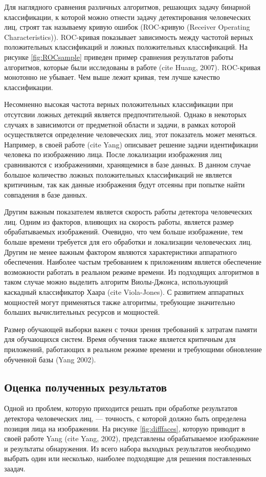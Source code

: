 Для наглядного сравнения различных алгоритмов, решающих задачу бинарной классификации, к которой можно отнести задачу детектирования человеческих лиц, строят так называему кривую ошибок (ROC-кривую (Receiver Operating Characteristics)). ROC-кривая показывает зависимость между частотой верных положительных классификаций и ложных положительных классификаций. На рисунке \ref{fig:ROCsample} приведен пример сравнения результатов работы алгоритмов, которые были исследованы в работе (cite Huang, 2007). ROC-кривая монотонно не убывает. Чем выше лежит кривая, тем лучше качество классификации.

Несомненно высокая частота верных положительных классификации при отсутсвии ложных детекций является предпочтительной. Однако в некоторых случаях в зависимотси от предметной области и задачи, в рамках которой осуществляется определение человеческих лиц, этот показатель может меняться. Например, в своей работе (cite Yang) описывает решение задачи идентификации человека по изображению лица. После локализации изображения лиц сравниваются с изображениями, хранящемися в базе данных. В данном случае большое количество ложных положительных классификаций не является критичиным, так как данные изображения будут отсеяны при попытке найти совпадения в базе данных.

Другим важным показателем является скорость работы детектора человеческих лиц. Одним из факторов, влияющих на скорость работы, является размер обрабатываемых изображений. Очевидно, что чем больше изображение, тем больше времени требуется для его обработки и локализации человеческих лиц. Другим не менее важным фактором являются характеристики аппаратного обеспечения. Наиболее частым требованием к приложениям является обеспечение возможности работать в реальном режиме времени. Из подходящих алгоритмов в таком случае можно выделить алгоритм Виолы-Джонса, использующий каскадный классификатор Хаара (cite Viola-Jones). С развитием аппаратных мощностей могут применяться также алгоритмы, требующие значительно больших вычислительных ресурсов и мощностей.

Размер обучающей выборки важен с точки зрения требований к затратам памяти для обучающихся систем. Время обучения также является критичным для приложений, работающих в реальном режиме времени и требующими обновление обученной базы (Yang 2002).

\subsection{Оценка полученных результатов}
Одной из проблем, которую приходится решать при обработке результатов детектора человеческих лиц, --- точность, с которой должно быть определена позиция лица на изображении. На рисунке \ref{fig:difffaces}, которую приводит в своей работе Yang (cite Yang, 2002), представлены обрабатываемое изображение и результаты обнаружения. Из всего набора выходных результатов необходимо выбрать один или несколько, наиболее подходящие для решения поставленных заадач. 


